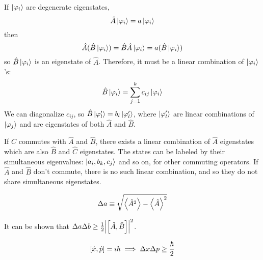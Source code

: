 \documentclass[a4paper,twoside,master.tex]{subfiles}
\begin{document}
If $\ket{\varphi_i} $ are degenerate eigenstates,
\begin{equation}
    \hat{A}\ket{\varphi_i} = a\ket{\varphi_i}
\end{equation}
then
\begin{equation}
    \hat{A} (\hat{B}\ket{\varphi_i}) = \hat{B} \hat{A}\ket{\varphi_i} = a (\hat{B}\ket{\varphi_i})
\end{equation}
so $ \hat{B}\ket{\varphi_i} $ is an eigenstate of $ \hat{A} $. Therefore, it must be a linear combination of $\ket{\varphi_i} $'s:
\begin{equation}
    \hat{B}\ket{\varphi_i} = \sum_{j=1}^{k} c_{ij}\ket{\varphi_i}
\end{equation}
We can diagonalize $ c_{ij} $, so $ \hat{B}\ket{\varphi'_l} = b_l\ket{\varphi'_l} $, where $\ket{\varphi'_l} $ are linear combinations of $\ket{\varphi_j} $ and are eigenstates of both $ \hat{A} $ and $ \hat{B} $.

If $ \hat{C} $ commutes with $ \hat{A} $ and $ \hat{B} $, there exists a linear combination of $ \hat{A} $ eigenstates which are also $ \hat{B} $ and $ \hat{C} $ eigenstates. The states can be labeled by their simultaneous eigenvalues: $\ket{a_i, b_k, c_j} $ and so on, for other commuting operators. If $ \hat{A} $ and $ \hat{B} $ don't commute, there is no such linear combination, and so they do not share simultaneous eigenstates.

\begin{definition}
    \begin{equation}
        \Delta a \equiv \sqrt{\ev{\hat{A}^2} - \ev{\hat{A}}^2}
    \end{equation}
\end{definition}
It can be shown that $ \Delta a \Delta b \geq \frac{1}{2} \abs{\comm{\hat{A}}{\hat{B}}}^2 $.
\begin{ex}
    \begin{equation}
        \comm{\hat{x}}{\hat{p}} = \imath \hbar \implies \Delta x \Delta p \geq \frac{\hbar}{2}
    \end{equation}
\end{ex}
\end{document}
